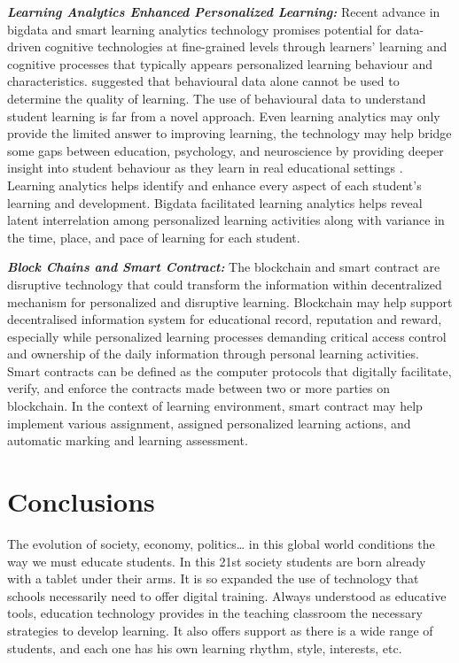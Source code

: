 \documentclass[english]{textolivre}
\begin{document}
\textbf{\emph{Learning Analytics Enhanced Personalized Learning:}} Recent advance in bigdata and smart learning analytics technology promises potential for data-driven cognitive technologies at fine-grained levels through learners’ learning and cognitive processes that typically appears personalized learning behaviour and characteristics. \textcite{lodge2012} suggested that behavioural data alone cannot be used to determine the quality of learning. The use of behavioural data to understand student learning is far from a novel approach. Even learning analytics may only provide the limited answer to improving learning, the technology may help bridge some gaps between education, psychology, and neuroscience by providing deeper insight into student behaviour as they learn in real educational settings \cite{lodge2017}. Learning analytics helps identify and enhance every aspect of each student’s learning and development. Bigdata facilitated learning analytics helps reveal latent interrelation among personalized learning activities along with variance in the time, place, and pace of learning for each student.

\textbf{\emph{Block Chains and Smart Contract:}} The blockchain and smart contract are disruptive technology that could transform the information within decentralized mechanism for personalized and disruptive learning. Blockchain may help support decentralised information system for educational record, reputation and reward, especially while personalized learning processes demanding critical access control and ownership of the daily information through personal learning activities. Smart contracts can be defined as the computer protocols that digitally facilitate, verify, and enforce the contracts made between two or more parties on blockchain. In the context of learning environment, smart contract may help implement various assignment, assigned personalized learning actions, and automatic marking and learning assessment.

\section{Conclusions}\label{sec-5}
The evolution of society, economy, politics… in this global world conditions the way we must educate students. In this 21st society students are born already with a tablet under their arms. It is so expanded the use of technology that schools necessarily need to offer digital training. Always understood as educative tools, education technology provides in the teaching classroom the necessary strategies to develop learning. It also offers support as there is a wide range of students, and each one has his own learning rhythm, style, interests, etc.
\end{document}
